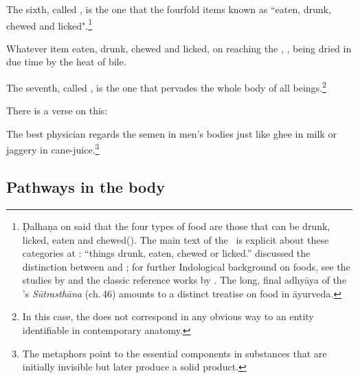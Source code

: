 \begin{translation}
 
 \item[18] 
 
The sixth, called , is the one that
 the fourfold items known as “eaten, drunk,
chewed and licked".\footnote{\label{fourfoods}Ḍalhaṇa on
     said that the four types of food are those that can be
    drunk, licked, eaten and chewed(). The
    main text of the \CS\ is explicit about these categories at
    :  “things drunk, eaten,
    chewed or licked.” \citet{yagi-1994} discussed the distinction between
     and ; for further Indological background on
    foods, see the studies by \citet{oliv-1995,oliv-2001} and the classic
    reference works by \citet{acha-1994,acha-1998}. The long, final
    adhyāya of the \SS's \emph{Sūtrasthāna} (ch.\,46) amounts to a
    distinct treatise on food in āyurveda.}
 
 \item[19]
 
 \begin{sloka}
   Whatever item eaten, drunk, chewed and licked, on reaching the
, , being dried in due
time by the heat of bile.
 \end{sloka}
 
\item[20]

The seventh, called , is the one that
pervades the whole body of all beings.\footnote{In this case, the
     does not correspond in any obvious way to an entity
    identifiable in contemporary anatomy.}

\item[21]

There is a verse on this:
\begin{sloka}   
    The best physician regards the semen in men's bodies just like
ghee in milk or jaggery in cane-juice.\footnote{The metaphors
    point to the essential components in substances that are initially
    invisible but later produce a solid product.}
\end{sloka}

\subsection{Pathways in the body}

\item[22]


\end{translation}
